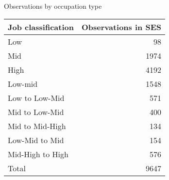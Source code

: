 \begin{center}
\begin{threeparttable}[!h]
\caption{Observations by occupation type}
\begin{tabular}{lr}
\toprule
\toprule
\textbf{Job classification}&\multicolumn{1}{c}{\textbf{Observations in SES}} \\
\midrule
\midrule
Low&98 \\
Mid&1974 \\
High&4192 \\
Low-mid&1548 \\
Low to Low-Mid&571 \\
Mid to Low-Mid&400 \\
Mid to Mid-High&134 \\
Low-Mid to Mid&154 \\
Mid-High to High&576 \\
Total&9647 \\
\bottomrule
\bottomrule
\end{tabular}
\end{threeparttable}
\end{center}
